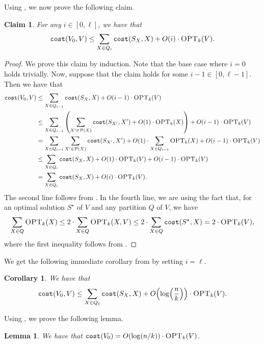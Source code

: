 \documentclass[11pt]{article}
\newcommand{\1}{\mathmybb{1}}
\newtheorem{lemma}[theorem]{Lemma}
\newtheorem{corollary}[theorem]{Corollary}
\newtheorem{claim}[theorem]{Claim}
\newcommand{\OPT}{\textsc{OPT}}
\newcommand{\cost}{\textnormal{\texttt{cost}}}
\begin{document}
Using , we now prove the following claim.

\begin{claim}\label{lem:apx:2}
For any $i \in [0, \ell]$, we have that
$$ \cost(V_0, V) \leq \sum_{X \in Q_i} \cost(S_{X}, X) + O(i) \cdot \OPT_k(V). $$
\end{claim}

\begin{proof}
    We prove this claim by induction. Note that the base case where $i = 0$ holds trivially. Now, suppose that the claim holds for some $i - 1 \in [0, \ell - 1]$. 
    Then we have that
    \begin{align*}
        \cost(V_0, V) &\leq \sum_{X \in Q_{i-1}} \cost(S_{X}, X) + O(i-1) \cdot \OPT_k(V)\\
        &\leq \sum_{X \in Q_{i-1}} \left( \sum_{X' \in \mathcal P(X)} \cost(S_{X'}, X') + O(1) \cdot \OPT_k(X) \right) + O(i-1) \cdot \OPT_k(V)\\
        &= \sum_{X \in Q_{i-1}}  \sum_{X' \in \mathcal P(X)} \cost(S_{X'}, X') + O(1) \cdot \sum_{X \in Q_{i-1}} \OPT_k(X) + O(i-1) \cdot \OPT_k(V)\\
        &\leq \sum_{X \in Q_{i}} \cost(S_{X}, X) + O(1) \cdot \OPT_k(V) + O(i-1) \cdot \OPT_k(V)\\
        &= \sum_{X \in Q_{i}} \cost(S_{X}, X) + O(i) \cdot \OPT_k(V).
    \end{align*}
    The second line follows from .
    In the fourth line, we are using the fact that, for an optimal solution $S^\star$ of $V$ and any partition $Q$ of $V$, we have
    $$\sum_{X \in Q} \OPT_k(X) \leq 2 \cdot \sum_{X \in Q} \OPT_k(X,V) \leq 2\cdot \sum_{X \in Q} \cost(S^\star, X) = 2 \cdot \OPT_k(V),$$
    where the first inequality follows from .
\end{proof}

We get the following immediate corollary from  by setting $i = \ell$.

\begin{corollary}\label{eq:aa}
We have that
$$\cost(V_0, V) \leq \sum_{X \in Q_\ell} \cost(S_{X}, X) + O \!\left( \log \! \left(\frac{n}{k} \right)\right) \cdot \OPT_k(V).$$
\end{corollary}

Using , we prove the following lemma.

\begin{lemma}\label{lem:bound on V0}
    We have that $\cost(V_0) = O(\log(n/k)) \cdot \OPT_k(V)$.
\end{lemma}
\end{document}
